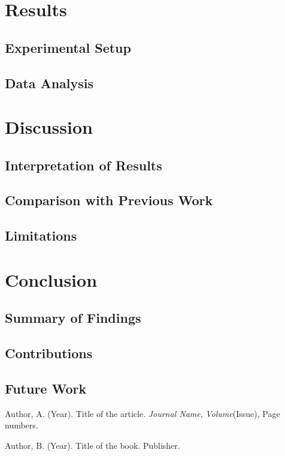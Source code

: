 \documentclass{report}
\begin{document}
\chapter{Results}
\section{Experimental Setup}
\section{Data Analysis}

\chapter{Discussion}
\section{Interpretation of Results}
\section{Comparison with Previous Work}
\section{Limitations}

\chapter{Conclusion}
\section{Summary of Findings}
\section{Contributions}
\section{Future Work}

\begin{thebibliography}{9}
Author, A. (Year). Title of the article. \textit{Journal Name}, \textit{Volume}(Issue), Page numbers.

Author, B. (Year). Title of the book. Publisher.
\end{thebibliography}
\end{document}
